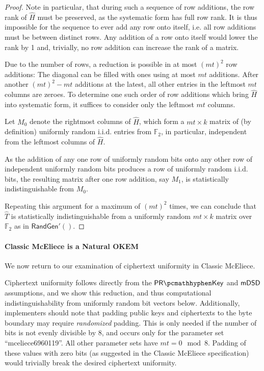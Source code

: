 \begin{proof}
    Note in particular, that during such a sequence of row additions, the row rank of $\hat H$ must be preserved, as the systematic form has full row rank. It is thus impossible for the sequence to ever add any row onto itself, i.e. all row additions must be between distinct rows. Any addition of a row onto itself would lower the rank by 1 and, trivially, no row addition can increase the rank of a matrix.
    
    Due to the number of rows, a reduction is possible in at most $(mt)^2$ row additions: The diagonal can be filled with ones using at most $mt$ additions. After another $(mt)^2-mt$ additions at the latest, all other entries in the leftmost $mt$ columns are zeroes. To determine one such order of row additions which bring $\hat H$ into systematic form, it suffices to consider only the leftmost $mt$ columns.
    
    Let $M_0$ denote the rightmost columns of $\hat H$, which form a $mt \times k$ matrix of (by definition) uniformly random i.i.d. entries from $\mathbb F_2$, in particular, independent from the leftmost columns of $\hat H$.
    
    As the addition of any one row of uniformly random bits onto any other row of independent uniformly random bits produces a row of uniformly random i.i.d. bits, the resulting matrix after one row addition, say $M_1$, is statistically indistinguishable from $M_0$.
    
    Repeating this argument for a maximum of $(mt)^2$ times, we can conclude that $\hat T$ is statistically indistinguishable from a uniformly random $mt \times k$ matrix over $\mathbb F_2$ as in $\mathsf{RandGen}'()$.
\end{proof}

\paragraph{Classic McEliece is a Natural OKEM}
We now return to our examination of ciphertext uniformity in Classic McEliece.

Ciphertext uniformity follows directly from the $\prkey$ and $\mathsf{mDSD}$ assumptions, and we show this reduction, and thus computational indistinguishability from uniformly random bit vectors below. Additionally, implementers should note that padding public keys and ciphertexts to the byte boundary may require \emph{randomized} padding. This is only needed if the number of bits is not evenly divisible by 8, and occurs only for the parameter set ``mceliece6960119''.  All other parameter sets have $mt = 0 \mod 8$. Padding of these values with zero bits (as suggested in the Classic McEliece specification) would trivially break the desired ciphertext uniformity.

